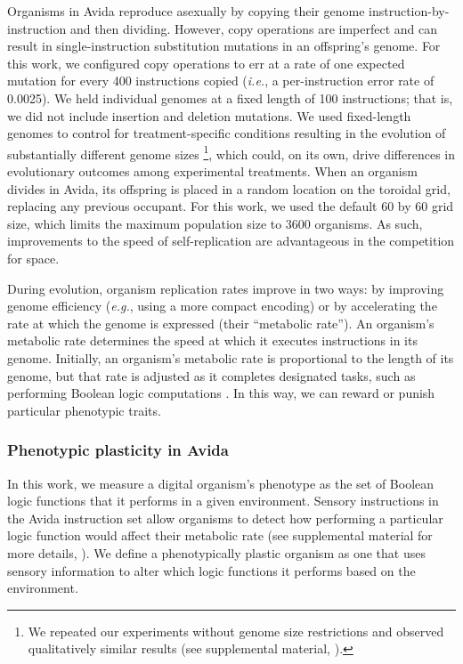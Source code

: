 Organisms in Avida reproduce asexually by copying their genome instruction-by-instruction and then dividing. 
However, copy operations are imperfect and can result in single-instruction substitution mutations in an offspring's genome. 
For this work, we configured copy operations to err at a rate of one expected mutation for every 400 instructions copied (\textit{i.e.}, a per-instruction error rate of 0.0025).
We held individual genomes at a fixed length of 100 instructions; that is, we did not include insertion and deletion mutations. 
We used fixed-length genomes to control for treatment-specific conditions resulting in the evolution of substantially different genome sizes \citep{supplemental_material}\footnote{
We repeated our experiments without genome size restrictions and observed qualitatively similar results (see supplemental material, \citealt{supplemental_material}).
}, which could, on its own, drive differences in evolutionary outcomes among experimental treatments.
When an organism divides in Avida, its offspring is placed in a random location on the toroidal grid, replacing any previous occupant.
For this work, we used the default 60 by 60 grid size, which limits the maximum population size to 3600 organisms.
As such, improvements to the speed of self-replication are advantageous in the competition for space.

During evolution, organism replication rates improve in two ways: by improving genome efficiency (\textit{e.g.}, using a more compact encoding) or by accelerating the rate at which the genome is expressed (their ``metabolic rate'').
An organism's metabolic rate determines the speed at which it executes instructions in its genome.
Initially, an organism's metabolic rate is proportional to the length of its genome, but that rate is adjusted as it completes designated tasks, such as performing Boolean logic computations \citep{ofria_avida:_2009}.
In this way, we can reward or punish particular phenotypic traits. 

\subsubsection{Phenotypic plasticity in Avida}

In this work, we measure a digital organism's phenotype as the set of Boolean logic functions that it performs in a given environment.
Sensory instructions in the Avida instruction set allow organisms to detect how performing a particular logic function would affect their metabolic rate (see supplemental material for more details, \citealt{supplemental_material}). 
We define a phenotypically plastic organism as one that uses sensory information to alter which logic functions it performs based on the environment.

